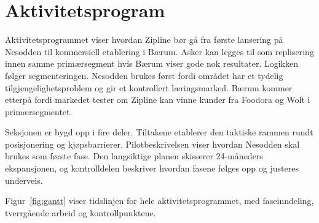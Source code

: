 \section{Aktivitetsprogram}

Aktivitetsprogrammet viser hvordan Zipline bør gå fra første lansering på
Nesodden til kommersiell etablering i Bærum. Asker kan legges til som
replisering innen samme primærsegment hvis Bærum viser gode nok resultater.
Logikken følger segmenteringen. Nesodden brukes først fordi området har et
tydelig tilgjengelighetsproblem og gir et kontrollert læringsmarked. Bærum
kommer etterpå fordi markedet tester om Zipline kan vinne kunder fra Foodora
og Wolt i primærsegmentet.

Seksjonen er bygd opp i fire deler. Tiltakene etablerer den taktiske
rammen rundt posisjonering og kjøpsbarrierer. Pilotbeskrivelsen viser
hvordan Nesodden skal brukes som første fase. Den langsiktige planen
skisserer 24-måneders ekspansjonen, og kontrolldelen beskriver
hvordan fasene følges opp og justeres underveis.

Figur~\ref{fig:gantt} viser tidslinjen for hele aktivitetsprogrammet,
med faseinndeling, tverrgående arbeid og kontrollpunktene.

